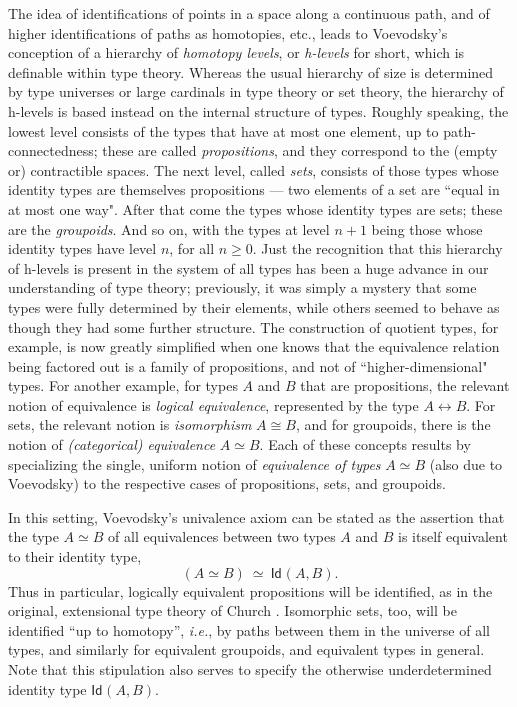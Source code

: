 \documentclass[11pt]{article}
\newcommand{\Id}{\mathsf{Id}}
\newcommand{\id}[1]{\Id_{#1}}
\begin{document}
The idea of identifications of points in a space along a continuous path, and of higher identifications of paths as homotopies, etc., leads to Voevodsky's conception of a hierarchy of \emph{homotopy levels}, or
\emph{h-levels} for short, which is definable within type theory.  Whereas the usual hierarchy of size is determined by type
universes or large cardinals in type theory or set theory, the hierarchy of h-levels is based instead on the internal
structure of types.  Roughly speaking, the lowest level consists of the types that have at most one element, up to
path-connectedness; these are called \emph{propositions}, and they correspond to the (empty or) contractible spaces.
The next level, called \emph{sets}, consists of those types whose identity types are themselves propositions --- two
elements of a set are ``equal in at most one way".  After that come the types whose
identity types are sets; these are the \emph{groupoids}.  And so on, with the types at level $n+1$ being those whose identity types have 
level $n$, for all $n\geq 0$.  Just the recognition that this hierarchy of h-levels is present in the system of all types
has been a huge advance in our understanding of type theory; previously, it was simply a mystery that some types were
fully determined by their elements, while others seemed to behave as though they had some further structure.  The
construction of quotient types, for example, is now greatly simplified when one knows that the equivalence relation
being factored out is a family of propositions, and not of ``higher-dimensional" types.  For another example, for types
$A$ and $B$ that are propositions, the relevant notion of equivalence is \emph{logical equivalence}, represented by the
type $A\leftrightarrow B$.  For sets, the relevant notion is \emph{isomorphism} $A\cong B$, and for groupoids, there is
the notion of \emph{(categorical) equivalence} $A\simeq B$.  Each of these concepts results by specializing the single,
uniform notion of \emph{equivalence of types} $A\simeq B$ (also due to Voevodsky) to the respective cases of
propositions, sets, and groupoids.

In this setting, Voevodsky's univalence axiom can be stated as the assertion that the type $A\simeq B$ of all
equivalences between two types $A$ and $B$ is itself equivalent to their identity type,
\[\tag{UA}
(A\simeq B)\ \simeq\  \id{}(A,B).
\]
Thus in particular, logically equivalent propositions will be identified, as in the original, extensional type theory of
Church \cite{Church}.  Isomorphic sets, too, will be identified ``up to homotopy'', \textit{i.e.}, by paths between them
in the universe of all types, and similarly for equivalent groupoids, and equivalent types in general.  Note that this
stipulation also serves to specify the otherwise underdetermined identity type $ \id{}(A,B)$.
\end{document}
